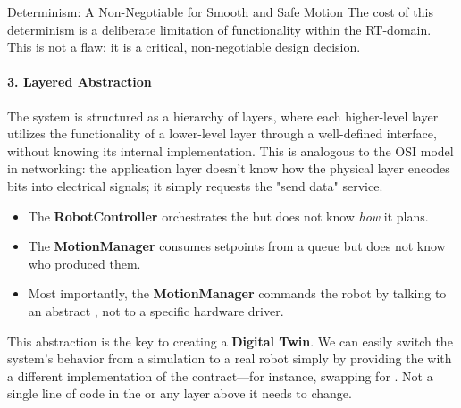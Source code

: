 \begin{principlebox}{Determinism: A Non-Negotiable for Smooth and Safe Motion}
    The cost of this determinism is a deliberate limitation of functionality within the RT-domain. This is not a flaw; it is a critical, non-negotiable design decision.
\end{principlebox}

\paragraph{3. Layered Abstraction}
The system is structured as a hierarchy of layers, where each higher-level layer utilizes the functionality of a lower-level layer through a well-defined interface, without knowing its internal implementation. This is analogous to the OSI model in networking: the application layer doesn't know how the physical layer encodes bits into electrical signals; it simply requests the "send data" service.
\begin{itemize}
    \item The \textbf{RobotController} orchestrates the  but does not know \textit{how} it plans.
    \item The \textbf{MotionManager} consumes setpoints from a queue but does not know who produced them.
    \item Most importantly, the \textbf{MotionManager} commands the robot by talking to an abstract , not to a specific hardware driver.
\end{itemize}
This abstraction is the key to creating a \textbf{Digital Twin}. We can easily switch the system's behavior from a simulation to a real robot simply by providing the  with a different implementation of the  contract—for instance, swapping  for . Not a single line of code in the  or any layer above it needs to change.


